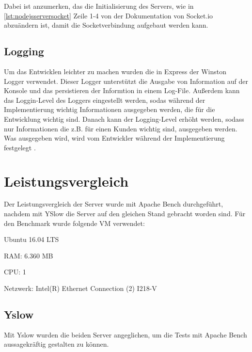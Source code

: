 Dabei ist anzumerken, das die Initialisierung des Servers, wie in \ref{lst:nodejsserversocket} Zeile 1-4 von der Dokumentation von Socket.io \parencite{socketio} abzuändern ist, damit die Socketverbindung aufgebaut werden kann. 

\subsection{Logging}
Um das Entwicklen leichter zu machen wurden die in Express der Winston Logger verwendet. Dieser Logger unterstützt die Ausgabe von Information auf der Konsole und das persistieren der Informtion in einem Log-File. Außerdem kann das Loggin-Level des Loggers eingestellt werden, sodas während der Implementierung wichtig Informationen ausgegeben werden, die für die Entwicklung wichtig sind. Danach kann der Logging-Level erhöht werden, sodass nur Informationen die z.B. für einen Kunden wichtig sind, ausgegeben werden. Was ausgegeben wird, wird vom Entwickler während der Implementierung festgelegt \parencite{winston}. 

\section{Leistungsvergleich}
Der Leistungsvergleich der Server wurde mit Apache Bench durchgeführt, nachdem mit YSlow die Server auf den gleichen Stand gebracht worden sind.  Für den Benchmark wurde folgende VM verwendet:

\begin{compactitem}
\item Ubuntu 16.04 LTS
\item RAM: 6.360 MB
\item CPU: 1
\item Netzwerk: Intel(R) Ethernet Connection (2) I218-V
\end{compactitem}

\subsection{Yslow}
Mit Yslow wurden die beiden Server angeglichen, um die Tests mit Apache Bench aussagekräftig gestalten zu können.

